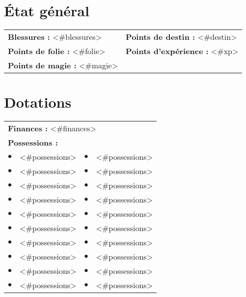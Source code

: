 \documentclass{scrartcl}
\begin{document}
\section*{{\'E}tat général}

\begin{tabular}{X{\arrlenZ} X{\arrlenZ}}
\textbf{Blessures :} <#blessures> & \textbf{Points de destin :} <#destin> \\
\textbf{Points de folie :} <#folie> & \textbf{Points d'expérience :} <#xp> \\
\textbf{Points de magie :} <#magie> & \\
\end{tabular}

\section*{Dotations}

\begin{tabular}{cX{\arrlenZ} cX{\arrlenZ}}
\multicolumn{4}{l}{\textbf{Finances :} <#finances>} \\
\multicolumn{4}{l}{\textbf{Possessions :}} \\
$\bullet$ & <#possessions> & $\bullet$ & <#possessions> \\
$\bullet$ & <#possessions> & $\bullet$ & <#possessions> \\
$\bullet$ & <#possessions> & $\bullet$ & <#possessions> \\
$\bullet$ & <#possessions> & $\bullet$ & <#possessions> \\
$\bullet$ & <#possessions> & $\bullet$ & <#possessions> \\
$\bullet$ & <#possessions> & $\bullet$ & <#possessions> \\
$\bullet$ & <#possessions> & $\bullet$ & <#possessions> \\
$\bullet$ & <#possessions> & $\bullet$ & <#possessions> \\
$\bullet$ & <#possessions> & $\bullet$ & <#possessions> \\
$\bullet$ & <#possessions> & $\bullet$ & <#possessions> \\
\end{tabular}
\end{document}
